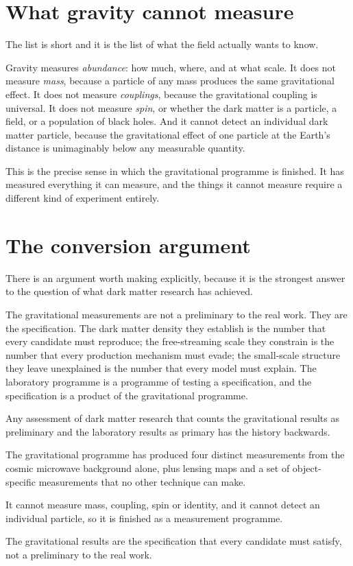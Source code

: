 \section{What gravity cannot measure}The list is short and it is the list of
what the field actually wants to know.

Gravity measures \emph{abundance}: how much, where, and at what scale. It
does not measure \emph{mass}, because a particle of any mass produces the
same gravitational effect. It does not measure \emph{couplings}, because the
gravitational coupling is universal. It does not measure \emph{spin}, or
whether the dark matter is a particle, a field, or a population of black
holes. And it cannot detect an individual dark matter particle, because the
gravitational effect of one particle at the Earth's distance is
unimaginably below any measurable quantity.

This is the precise sense in which the gravitational programme is finished.
It has measured everything it can measure, and the things it cannot measure
require a different kind of experiment entirely.

\section{The conversion argument}There is an argument worth making explicitly,
because it is the strongest answer to the question of what dark matter
research has achieved.

The gravitational measurements are not a preliminary to the real work. They
are the specification. The dark matter density they establish is the number
that every candidate must reproduce; the free-streaming scale they constrain
is the number that every production mechanism must evade; the small-scale
structure they leave unexplained is the number that every model must
explain. The laboratory programme is a programme of testing a
specification, and the specification is a product of the gravitational
programme.

Any assessment of dark matter research that counts the gravitational results
as preliminary and the laboratory results as primary has the history
backwards.

\begin{keytakeaways}
\item The gravitational programme has produced four distinct measurements
from the cosmic microwave background alone, plus lensing maps and a set of
object-specific measurements that no other technique can make.
\item It cannot measure mass, coupling, spin or identity, and it cannot
detect an individual particle, so it is finished as a measurement programme.
\item The gravitational results are the specification that every candidate
must satisfy, not a preliminary to the real work.
\end{keytakeaways}
